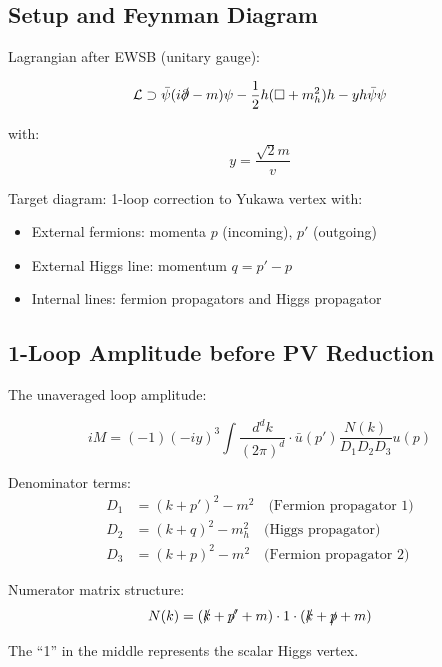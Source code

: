 	\subsection{Setup and Feynman Diagram}
	
	Lagrangian after EWSB (unitary gauge):
	
	\begin{equation}
		\mathcal{L} \supset \bar{\psi}(i\slashed{\partial} - m)\psi - \frac{1}{2}h(\Box + m_h^2)h - y h \bar{\psi}\psi
	\end{equation}
	
	with:
	\begin{equation}
		y = \frac{\sqrt{2} m}{v}
	\end{equation}
	
	Target diagram: 1-loop correction to Yukawa vertex with:
	\begin{itemize}
		\item External fermions: momenta $p$ (incoming), $p'$ (outgoing)
		\item External Higgs line: momentum $q = p' - p$
		\item Internal lines: fermion propagators and Higgs propagator
	\end{itemize}
	
	\subsection{1-Loop Amplitude before PV Reduction}
	
	The unaveraged loop amplitude:
	
	\begin{equation}
		iM = (-1)(-iy)^3 \int \frac{d^d k}{(2\pi)^d} \cdot \bar{u}(p') \frac{N(k)}{D_1 D_2 D_3} u(p)
	\end{equation}
	
	Denominator terms:
	\begin{align}
		D_1 &= (k + p')^2 - m^2 \quad \text{(Fermion propagator 1)}\\
		D_2 &= (k + q)^2 - m_h^2 \quad \text{(Higgs propagator)}\\
		D_3 &= (k + p)^2 - m^2 \quad \text{(Fermion propagator 2)}
	\end{align}
	
	Numerator matrix structure:
	\begin{equation}
		N(k) = (\slashed{k} + \slashed{p'} + m) \cdot 1 \cdot (\slashed{k} + \slashed{p} + m)
	\end{equation}
	
	The ``1'' in the middle represents the scalar Higgs vertex.
	
